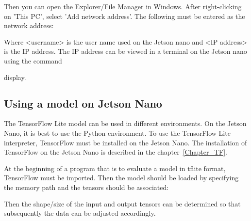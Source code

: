 \medskip

Then you can open the Explorer/File Manager in Windows. After right-clicking on 'This PC', select 'Add network address'. The following must be entered as the network address:

\medskip


\medskip

Where <username> is the user name used on the Jetson nano and <IP address> is the IP address. The IP address can be viewed in a terminal on the Jetson nano using the command

\medskip


\medskip

display.




\subsection{Using a model on Jetson Nano}

The TensorFlow Lite model can be used in different environments. On the Jetson Nano, it is best to use the Python environment. To use the TensorFlow Lite interpreter, TensorFlow must be installed on the Jetson Nano. The installation of TensorFlow on the Jetson Nano is described in the chapter~\ref{Chapter_TF}. 

At the beginning of a program that is to evaluate a model in tflite format, TensorFlow must be imported. Then the model should be loaded by specifying the memory path and the tensors should be associated:


\medskip




\medskip


Then the shape/size of the input and output tensors can be determined so that subsequently the data can be adjusted accordingly.

\medskip




